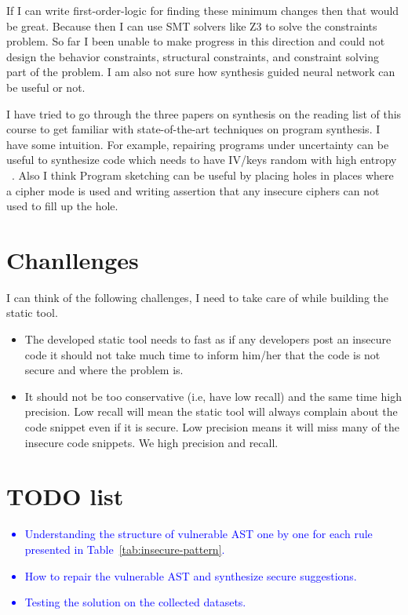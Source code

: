 \documentclass[sigconf]{acmart}
\begin{document}
If I can write first-order-logic for finding these minimum changes then that would be great. Because then I can use SMT solvers like Z3 to solve the constraints problem. 
So far I been unable to make progress in this direction and could not design the behavior constraints, structural constraints, and constraint solving part of the problem. I am also not sure how synthesis guided neural network can be useful or not. 

I have tried to go through the three papers on synthesis on the reading list of this course to get familiar with state-of-the-art techniques on program synthesis. I have some intuition. For example, repairing programs under uncertainty can be useful to synthesize code which needs to have IV/keys random with high entropy ~\cite{albarghouthi2017repairing}. Also I think Program sketching can be useful by placing holes in places where a cipher mode is used and writing assertion that any insecure ciphers can not used to fill up the hole.    

\section{Chanllenges}
I can think of the following challenges, I need to take care of while building the static tool.
\begin{itemize}
  \item The developed static tool needs to fast as if any developers post an insecure code it should not take much time to inform him/her that the code is not secure and where the problem is.
  \item It should not be too conservative (i.e, have low recall) and the same time high precision. Low recall will mean the static tool will always complain about the code snippet even if it is secure. Low precision means it will miss many of the insecure code snippets. We high precision and recall. 
\end{itemize}

\section{TODO list}
\textcolor{blue}{
\begin{itemize}
  \item Understanding the structure of vulnerable AST one by one for each rule presented in Table~\ref{tab:insecure-pattern}.
  \item How to repair the vulnerable AST and synthesize secure suggestions. 
  \item Testing the solution on the collected datasets.
\end{itemize}
}
\fi
\end{document}
